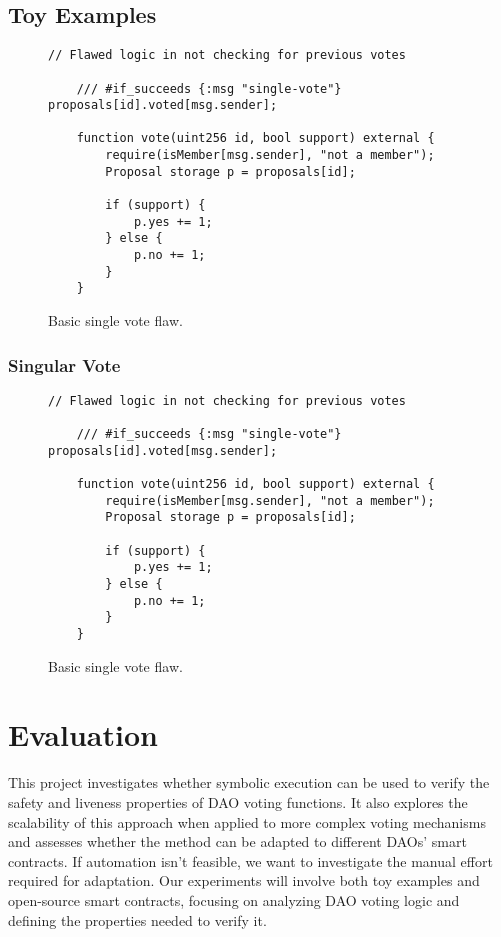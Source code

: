 \documentclass[conference]{IEEEtran}
\begin{document}
\subsection{Toy Examples}
\begin{figure}[h]
\centering
\begin{lstlisting}[basicstyle=\ttfamily\small,breaklines=true]
    // Flawed logic in not checking for previous votes
    
    /// #if_succeeds {:msg "single-vote"} proposals[id].voted[msg.sender];
    
    function vote(uint256 id, bool support) external {
        require(isMember[msg.sender], "not a member");
        Proposal storage p = proposals[id];

        if (support) {
            p.yes += 1;
        } else {
            p.no += 1;
        }
    }
\end{lstlisting}
\caption{Basic single vote flaw.}
\label{fig:vote_function}
\end{figure}

\subsubsection{Singular Vote} 

\begin{figure}[h]
\centering
\begin{lstlisting}[basicstyle=\ttfamily\small,breaklines=true]
    // Flawed logic in not checking for previous votes
    
    /// #if_succeeds {:msg "single-vote"} proposals[id].voted[msg.sender];
    
    function vote(uint256 id, bool support) external {
        require(isMember[msg.sender], "not a member");
        Proposal storage p = proposals[id];

        if (support) {
            p.yes += 1;
        } else {
            p.no += 1;
        }
    }
\end{lstlisting}
\caption{Basic single vote flaw.}
\label{fig:vote_function}
\end{figure}



\section{Evaluation}

This project investigates whether symbolic execution can be used to verify the safety and liveness properties of DAO voting functions. It also explores the scalability of this approach when applied to more complex voting mechanisms and assesses whether the method can be adapted to different DAOs' smart contracts. If automation isn't feasible, we want to investigate the manual effort required for adaptation. Our experiments will involve both toy examples and open-source smart contracts, focusing on analyzing DAO voting logic and defining the properties needed to verify it.
\end{document}
